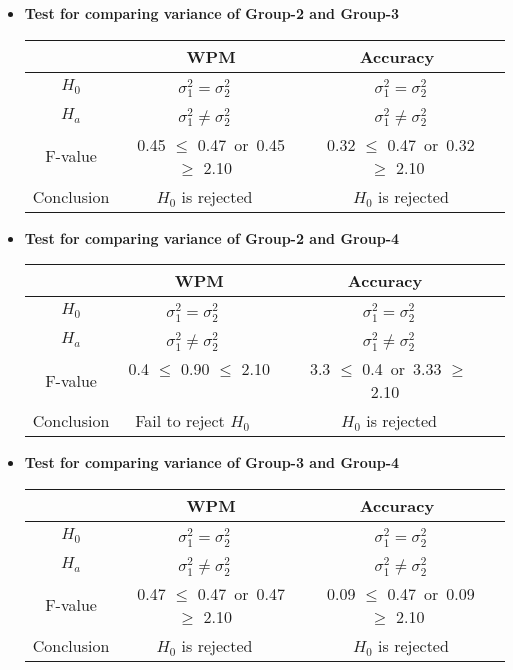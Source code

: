 \documentclass[12pt,a4paper]{report}
\begin{document}
\begin{enumerate}
\begin{itemize}
        \item \textbf{Test for comparing variance of Group-2 and Group-3}
        \begin{center}
        \begin{tabular}{ |c|c|c|c|}
          \hline
           & WPM & Accuracy \\
          \hline
          $H_0$ & $\sigma_1^2  = \sigma_2^2$ \ & \ $\sigma_1^2  = \sigma_2^2$ \\ 
          \hline
          $H_a$ & $\sigma_1^2  \neq \sigma_2^2$ \ & \ $\sigma_1^2  \neq \sigma_2^2$ \\
          \hline
          F-value &  0.45 $\leq$ 0.47\ or\  0.45 $\geq$ 2.10   \ & \ 0.32 $\leq$ 0.47\ or\  0.32 $\geq$ 2.10 \\
          \hline
          Conclusion & $H_0$ is rejected \ & \ $H_0$ is rejected\\
          \hline
        \end{tabular}
        \end{center}
        \item \textbf{Test for comparing variance of Group-2 and Group-4}
        \begin{center}
        \begin{tabular}{ |c|c|c|c|}
          \hline
           & WPM & Accuracy \\
          \hline
          $H_0$ & $\sigma_1^2  = \sigma_2^2$ \ & \ $\sigma_1^2  = \sigma_2^2$ \\ 
          \hline
          $H_a$ & $\sigma_1^2  \neq \sigma_2^2$ \ & \ $\sigma_1^2  \neq \sigma_2^2$ \\
          \hline
          F-value &  0.4 $\leq$ 0.90 $\leq$ 2.10   \ & \ 3.3 $\leq$ 0.4\ or\  3.33 $\geq$ 2.10 \\
          \hline
          Conclusion & Fail to reject $H_0$ \ & \ $H_0$ is rejected\\
          \hline
        \end{tabular}
        \end{center}
        \item \textbf{Test for comparing variance of Group-3 and Group-4}
        \begin{center}
        \begin{tabular}{ |c|c|c|c|}
          \hline
           & WPM & Accuracy \\
          \hline
          $H_0$ & $\sigma_1^2  = \sigma_2^2$ \ & \ $\sigma_1^2  = \sigma_2^2$ \\ 
          \hline
          $H_a$ & $\sigma_1^2  \neq \sigma_2^2$ \ & \ $\sigma_1^2  \neq \sigma_2^2$ \\
          \hline
          F-value &  0.47 $\leq$ 0.47\ or\  0.47 $\geq$ 2.10   \ & \ 0.09 $\leq$ 0.47\ or\  0.09 $\geq$ 2.10 \\
          \hline
          Conclusion & $H_0$ is rejected \ & \ $H_0$ is rejected\\
          \hline
        \end{tabular}
        \end{center}
    \end{itemize}
\end{enumerate}
\end{document}
